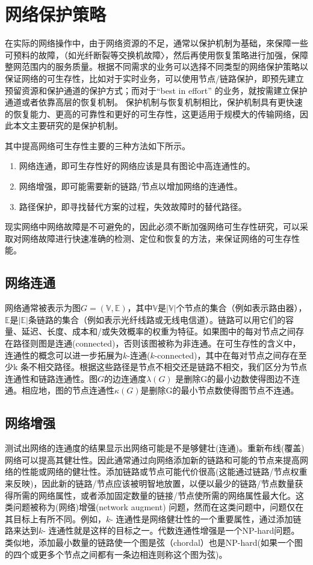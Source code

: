 \section{网络保护策略}
在实际的网络操作中，由于网络资源的不足，通常以保护机制为基础，來保障一些可预料的故障，（如光纤断裂等交换机故障〉，然后再使用恢复策略进行加强，保障整网范围内的服务质量。根据不同需求的业务可以选择不同类型的网络保护策略以保证网络的可生存性，比如对于实时业务，可以使用节点/链路保护，即预先建立预留资源和保护通道的保护方式；而对于“best in effort” 的业务，就按需建立保护通道或者依靠高层的恢复机制。 保护机制与恢复机制相比，保护机制具有更快速的恢复能力、更高的可靠性和更好的可生存性，这更适用于规模大的传输网络，因此本文主要研究的是保护机制。

其中提高网络可生存性主要的三种方法如下所示。
\begin{enumerate}
\item 网络连通，即可生存性好的网络应该是具有图论中高连通性的。
\item 网络增强，即可能需要新的链路/节点以增加网络的连通性。
\item 路径保护，即寻找替代方案的过程，失效故障时的替代路径。
\end{enumerate}


现实网络中网络故障是不可避免的，因此必须不断加强网络可生存性研究，可以采取对网络故障进行快速准确的检测、定位和恢复的方法，来保证网络的可生存性能。
\subsection{网络连通}
网络通常被表示为图$G=(\mathbb{\mathbb{V}},\mathbb{\mathbb{E}})$，其中$\mathbb{\mathbb{V}}$是$|\mathbb{\mathbb{V}}|$个节点的集合（例如表示路由器），$\mathbb{\mathbb{E}}$是$|\mathbb{\mathbb{E}}|$条链路的集合（例如表示光纤线路或无线电信道）。链路可以用它们的容量、延迟、长度、成本和/或失效概率的权重为特征。如果图中的每对节点之间存在路径则图是连通(connected)，否则该图被称为非连通。在可生存性的含义中，连通性的概念可以进一步拓展为$k$-连通($k$-connected)，其中在每对节点之间存在至少k 条不相交路径。根据这些路径是节点不相交还是链路不相交，我们区分为节点连通性和链路连通性。图$G$的边连通度$\lambda(G)$ 是删除G的最小边数使得图边不连通。相应地，图的节点连通性$\kappa(G)$是删除G的最小节点数使得图节点不连通。

\subsection{网络增强}
测试出网络的连通度的结果显示出网络可能是不是够健壮(连通)。重新布线(覆盖)网络可以提高其健壮性\cite{van2010influence}。因此通常通过向网络添加新的链路和可能的节点来提高网络的性能或网络的健壮性。添加链路或节点可能代价很高(这能通过链路/节点权重来反映)，因此新的链路/节点应该被明智地放置，以便以最少的链路/节点数量获得所需的网络属性，或者添加固定数量的链接/节点使所需的网络属性最大化。这类问题被称为(网络)增强(network augment) 问题，然而在这类问题中，问题仅在其目标上有所不同。例如，$k$- 连通性是网络健壮性的一个重要属性，通过添加链路来达到$k$- 连通性就是这样的目标之一。代数连通性增强是一个NP-hard问题\cite{mosk2008maximum}。 类似地，添加最小数量的链路使一个图是弦（chordal）也是NP-hard\cite{yannakakis1981computing}(如果一个图的四个或更多个节点之间都有一条边相连则称这个图为弦)。
